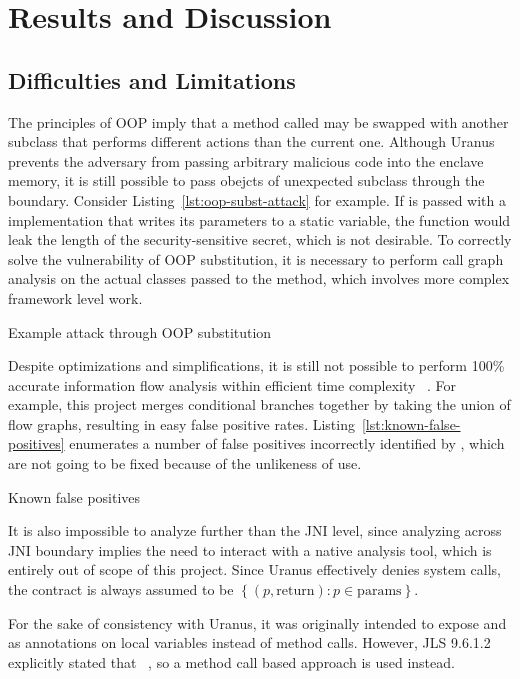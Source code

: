 \section{Results and Discussion}\label{sec:results-and-discussion}

\subsection{Difficulties and Limitations}\label{subsec:difficulties-and-limitations}
The principles of OOP imply that a method called may be swapped with another subclass
that performs different actions than the current one.
Although Uranus prevents the adversary
from passing arbitrary malicious code into the enclave memory,
it is still possible to pass obejcts of unexpected subclass
through the  boundary.
Consider Listing~\ref{lst:oop-subst-attack} for example.
If  is passed with a  implementation
that writes its parameters to a static variable,
the function would leak the length of the security-sensitive secret,
which is not desirable.
To correctly solve the vulnerability of OOP substitution,
it is necessary to perform call graph analysis on the actual classes passed to the method,
which involves more complex framework level work.

{Example attack through OOP substitution}

Despite optimizations and simplifications,
it is still not possible to perform 100\% accurate information flow analysis
within efficient time complexity ~\cite{SmithGeoffrey2007PoSI}.
For example, this project merges conditional branches together
by taking the union of flow graphs,
resulting in easy false positive rates.
Listing~\ref{lst:known-false-positives} enumerates a number of false positives
incorrectly identified by \pname{},
which are not going to be fixed because of the unlikeness of use.

{Known false positives}

It is also impossible to analyze further than the JNI level,
since analyzing across JNI boundary implies
the need to interact with a native analysis tool,
which is entirely out of scope of this project.
Since Uranus effectively denies system calls,
the contract is always assumed to be
$\left\{ (p, \text{return}) : p \in \text{params} \right\}$.

For the sake of consistency with Uranus,
it was originally intended to expose  and 
as annotations on local variables instead of method calls.
However, JLS 9.6.1.2 explicitly stated that
 ~\cite{jls},
so a method call based approach is used instead.

